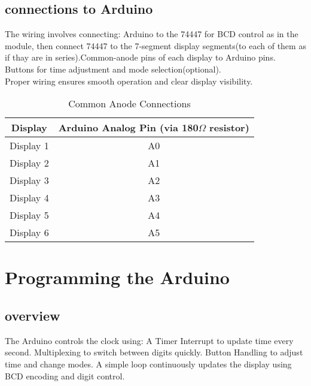 \documentclass[journal]{IEEEtran}
\begin{document}
\subsection{connections to Arduino}
The wiring involves connecting:
 Arduino to the 74447 for BCD control as in the module, then connect 74447 to the 7-segment display segments(to each of them as if thay are in series).Common-anode pins of each display to Arduino pins. Buttons for time adjustment and mode selection(optional).\\
 Proper wiring ensures smooth operation and clear display visibility.\\
\begin{table}[H]
    \centering
    \caption{Common Anode Connections}
    \begin{tabular}{|c|c|}
        \hline
        \textbf{Display} & \textbf{Arduino Analog Pin (via 180$\Omega$ resistor)} \\
        \hline
        Display 1 & A0 \\
        Display 2 & A1 \\
        Display 3 & A2 \\
        Display 4 & A3 \\
        Display 5 & A4 \\
        Display 6 & A5 \\
        \hline
    \end{tabular}
\end{table}
\section{Programming the Arduino}
\subsection{overview}
The Arduino controls the clock using:
A Timer Interrupt to update time every second. Multiplexing to switch between digits quickly. Button Handling to adjust time and change modes. A simple loop continuously updates the display using BCD encoding and digit control.
\end{document}
